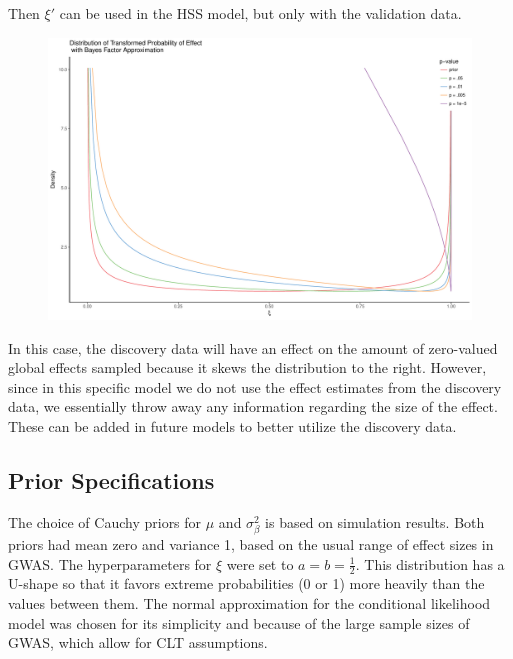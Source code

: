 \documentclass[AMA,STIX1COL]{WileyNJD-v2}\usepackage[]{graphicx}\usepackage[]{color}
\newenvironment{knitrout}{}{} %
\begin{document}
Then $\xi'$ can be used in the HSS model, but only with the validation data.




\begin{figure}
\begin{knitrout}
\color{fgcolor}

{\centering \includegraphics[width=6in]{figure/unnamed-chunk-5-1} 

}



\end{knitrout}
\end{figure}

In this case, the discovery data will have an effect on the amount of zero-valued global effects sampled because it skews the distribution to the right. However, since in this specific model we do not use the effect estimates from the discovery data, we essentially throw away any information regarding the size of the effect. These can be added in future models to better utilize the discovery data.


\subsection{Prior Specifications}


The choice of Cauchy priors for $\mu$ and $\sigma^2_{\beta}$ is based on simulation results. Both priors had mean zero and variance 1, based on the usual range of effect sizes in GWAS. The hyperparameters for $\xi$ were set to $a = b= \frac{1}{2}$. This distribution has a U-shape so that it favors extreme probabilities (0 or 1) more heavily than the values between them.  The normal approximation for the conditional likelihood model was chosen for its simplicity and because of the large sample sizes of GWAS, which allow for CLT assumptions.
\end{document}
